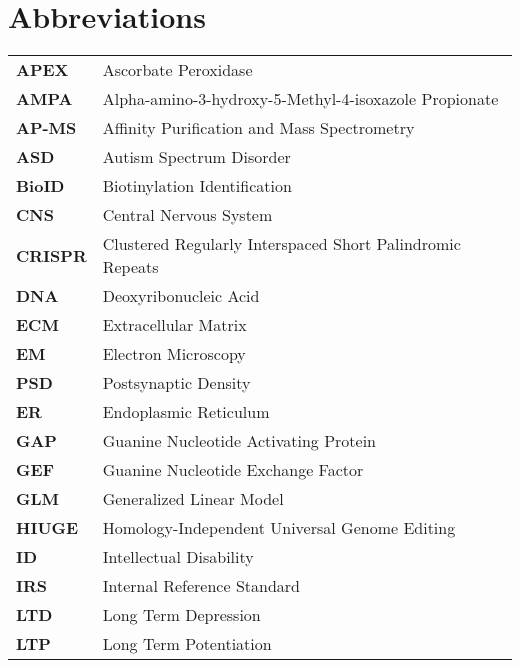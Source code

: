 \section*{Abbreviations}

\begin{tabular}{ >{\bfseries}l l }
	APEX	 &  Ascorbate Peroxidase \\
	AMPA     &  Alpha-amino-3-hydroxy-5-Methyl-4-isoxazole Propionate \\
	AP-MS    &  Affinity Purification and Mass Spectrometry \\
	ASD      &  Autism Spectrum Disorder \\
	BioID	 &  Biotinylation Identification \\
	CNS	 &  Central Nervous System \\
	CRISPR   &  Clustered Regularly Interspaced Short Palindromic Repeats \\
	DNA 	 &  Deoxyribonucleic Acid \\
	ECM 	 &  Extracellular Matrix \\
	EM 	 &  Electron Microscopy \\
	PSD 	 &  Postsynaptic Density \\
	ER 	 &  Endoplasmic Reticulum \\
	GAP      &  Guanine Nucleotide Activating Protein \\
	GEF      &  Guanine Nucleotide Exchange Factor \\
	GLM  	 &  Generalized Linear Model \\
	HIUGE    &  Homology-Independent Universal Genome Editing \\
	ID       &  Intellectual Disability \\
	IRS 	 &  Internal Reference Standard \\
	LTD      &  Long Term Depression \\
	LTP      &  Long Term Potentiation \\
\end{tabular}

